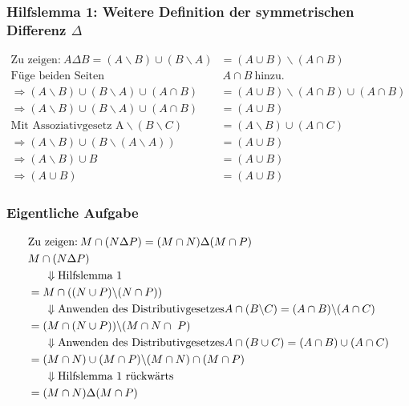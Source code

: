 \documentclass{article}
\begin{document}
            \subsubsection*{Hilfslemma 1: Weitere Definition der symmetrischen Differenz \( \Delta \)}
                \begin{lemma}
                    \begin{align*}
                        \text{Zu zeigen:} \: A \Delta B = (A \backslash B) \cup (B \backslash A) &= (A \cup B) \backslash (A \cap B) \\
                        \text{Füge beiden Seiten} &\: A \cap B \: \text{hinzu.} \\
                        \Rightarrow (A \backslash B ) \cup ( B \backslash A ) \cup ( A \cap B ) &= ( A \cup B ) \backslash ( A \cap B ) \cup ( A \cap B ) \\
                        \Rightarrow (A \backslash B ) \cup ( B \backslash A ) \cup ( A \cap B ) &= (A \cup B) \\
                        \text{Mit Assoziativgesetz A} \backslash (B \backslash C) &= (A \backslash B) \cup (A \cap C) \\
                        \Rightarrow (A \backslash B ) \cup ( B \backslash (A \backslash A) ) &= (A \cup B) \\
                        \Rightarrow (A \backslash B ) \cup B &= (A \cup B) \\
                        \Rightarrow (A \cup B) &= (A \cup B)
                    \end{align*}
                \end{lemma}

            \subsubsection*{Eigentliche Aufgabe}
                \begin{align*}
                    &\text{Zu zeigen:} \: M \cap (N \Delta P) = (M \cap N) \Delta (M \cap P) \\
                    &M \cap (N \Delta P) \\
                    &\indent \Downarrow \text{Hilfslemma 1} \\
                    &= M \cap ((N \cup P) \backslash (N \cap P)) \\
                    &\indent \Downarrow \text{Anwenden des Distributivgesetzes} A \cap (B \backslash C) = (A \cap B ) \backslash (A \cap C) \\
                    &= (M \cap (N \cup P)) \backslash (M \cap N \cap \ P) \\
                    &\indent \Downarrow \text{Anwenden des Distributivgesetzes} A \cap (B \cup C) = (A \cap B ) \cup (A \cap C) \\
                    &=(M \cap N) \cup (M \cap P) \backslash (M \cap N) \cap (M \cap P)\\
                    &\indent \Downarrow \text{Hilfslemma 1 rückwärts}\\
                    &=(M \cap N) \Delta (M \cap P)
                \end{align*}
    
\end{document}

